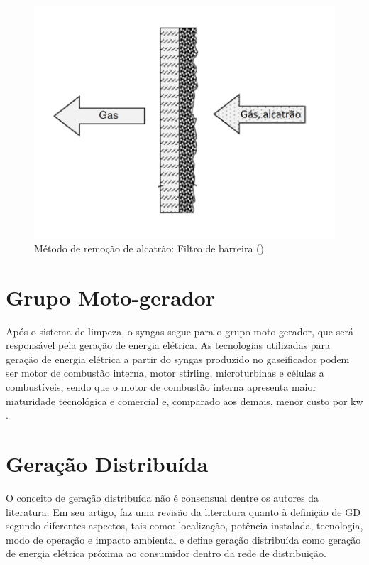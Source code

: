 \begin{figure}[!htb]
	\centering
	\includegraphics{filtro}
	\caption{Método de remoção de alcatrão: Filtro de barreira (\cite{basu2010})}
	\label{filtro}
\end{figure}


\section{Grupo Moto-gerador}
Após o sistema de limpeza, o syngas segue para o grupo moto-gerador, que será responsável pela geração de energia elétrica. As tecnologias utilizadas para geração de energia elétrica a partir do syngas produzido no gaseificador podem ser motor de combustão interna, motor stirling, microturbinas e células a combustíveis, sendo que o motor de combustão interna apresenta maior maturidade tecnológica e comercial \cite{lora2006} e, comparado aos demais, menor custo por kw \cite{chaves2016}.


\section{Geração Distribuída}

O conceito de geração distribuída não é consensual dentre os autores da literatura. Em seu artigo, \cite{ackermann2001} faz uma revisão da literatura quanto à definição de GD segundo diferentes aspectos, tais como: localização, potência instalada, tecnologia, modo de operação e impacto ambiental e define geração distribuída como geração de energia elétrica próxima ao consumidor dentro da rede de distribuição.

